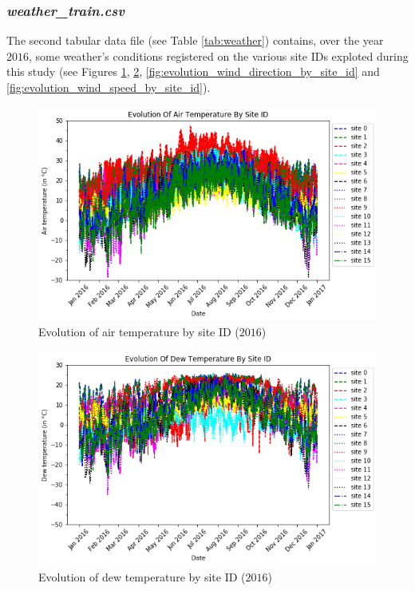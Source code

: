 \documentclass[twocolumn, switch]{article}
\begin{document}
\subsubsection{\textit{weather\_train.csv}}

The second tabular data file (see Table \ref{tab:weather}) contains, over the year $2016$, some weather's conditions registered on the various site IDs exploted during this study (see Figures \ref{fig:evolution_air_temperature_by_site_id}, \ref{fig:evolution_dew_temperature_by_site_id}, \ref{fig:evolution_wind_direction_by_site_id} and \ref{fig:evolution_wind_speed_by_site_id}).

\begin{figure}[H]
\centering
\includegraphics[scale=0.35]{../graphs/evolution_air_temperature_by_site_id}
\caption{Evolution of air temperature by site ID ($2016$)}
\label{fig:evolution_air_temperature_by_site_id}
\end{figure}

\begin{figure}[H]
\centering
\includegraphics[scale=0.35]{../graphs/evolution_dew_temperature_by_site_id}
\caption{Evolution of dew temperature by site ID ($2016$)}
\label{fig:evolution_dew_temperature_by_site_id}
\end{figure}
\end{document}
